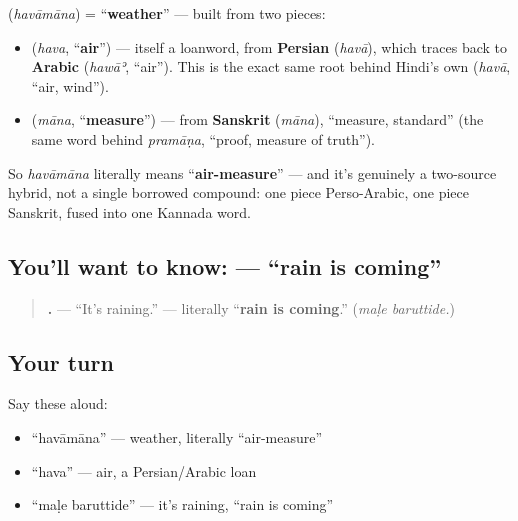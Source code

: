 \begin{cousinweb}
\textbf{} (\emph{havāmāna}) = \textquotedblleft{}\textbf{weather}\textquotedblright{} — built from two pieces:

\begin{itemize}
\raggedright
  \item \textbf{} (\emph{hava}, \textquotedblleft{}\textbf{air}\textquotedblright{}) — itself a loanword, from \textbf{Persian} \textbf{} (\emph{havā}), which traces back to \textbf{Arabic} \textbf{} (\emph{hawāʾ}, \textquotedblleft{}air\textquotedblright{}). This is the exact same root behind Hindi's own \textbf{} (\emph{havā}, \textquotedblleft{}air, wind\textquotedblright{}).
  \item \textbf{} (\emph{māna}, \textquotedblleft{}\textbf{measure}\textquotedblright{}) — from \textbf{Sanskrit} \textbf{} (\emph{māna}), \textquotedblleft{}measure, standard\textquotedblright{} (the same word behind \emph{pramāṇa}, \textquotedblleft{}proof, measure of truth\textquotedblright{}).
\end{itemize}

So \emph{havāmāna} literally means \textquotedblleft{}\textbf{air-measure}\textquotedblright{} — and it's genuinely a two-source hybrid, not a single borrowed compound: one piece Perso-Arabic, one piece Sanskrit, fused into one Kannada word.
\end{cousinweb}

\subsection*{You'll want to know:   — \textquotedblleft{}rain is coming\textquotedblright{}}
\begin{quote}
\textbf{ .} — \textquotedblleft{}It's raining.\textquotedblright{} — literally \textquotedblleft{}\textbf{rain is coming}.\textquotedblright{} (\emph{maḷe baruttide.})
\end{quote}

\subsection*{Your turn}
Say these aloud:

\begin{itemize}
\raggedright
  \item \textquotedblleft{}havāmāna\textquotedblright{} — weather, literally \textquotedblleft{}air-measure\textquotedblright{}
  \item \textquotedblleft{}hava\textquotedblright{} — air, a Persian/Arabic loan
  \item \textquotedblleft{}maḷe baruttide\textquotedblright{} — it's raining, \textquotedblleft{}rain is coming\textquotedblright{}
\end{itemize}

